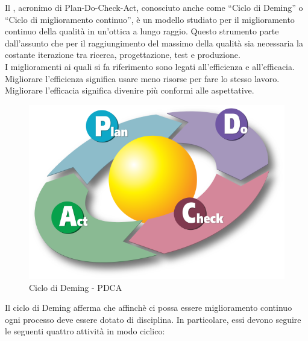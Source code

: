 
 \label{app:pdca}
Il , acronimo di Plan-Do-Check-Act, conosciuto anche come “Ciclo di Deming” o “Ciclo di miglioramento continuo”, è un modello studiato per il miglioramento continuo della qualità in un'ottica a lungo raggio. Questo strumento parte dall’assunto che per il raggiungimento del massimo della qualità sia necessaria la costante iterazione tra ricerca, progettazione, test e produzione.\\
I miglioramenti ai quali si fa riferimento sono legati all'efficienza e all'efficacia. Migliorare l'efficienza significa usare meno risorse per fare lo stesso lavoro. Migliorare l'efficacia significa divenire più conformi alle aspettative.\\
\begin{figure}[H]
	\centering
	\includegraphics[width=12cm]{PianoDiQualifica/Pics/PDCA_Cycle.png}
	\caption{Ciclo di Deming - PDCA}
\end{figure}
Il ciclo di Deming afferma che affinchè ci possa essere miglioramento continuo ogni processo deve essere dotato di disciplina. In particolare, essi devono seguire le seguenti quattro attività in modo ciclico:
